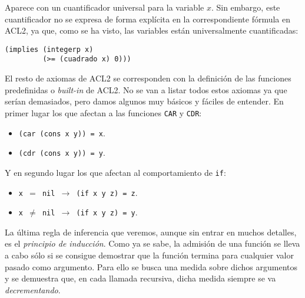 \documentclass[a4paper,10pt]{article}
\begin{document}
\par\vspace{10pt}

Aparece con un cuantificador universal para la variable $x$. Sin embargo, este cuantificador no se expresa de forma explícita en la correspondiente fórmula en ACL2, ya que, como se ha visto, las variables están universalmente cuantificadas:

\par\vspace{10pt}

\begin{lstlisting}[language=clips]
(implies (integerp x)
         (>= (cuadrado x) 0)))
\end{lstlisting}
	
\par\vspace{10pt}

El resto de axiomas de ACL2 se corresponden con la definición de las funciones predefinidas o \emph{built-in} de ACL2. No se van a listar todos estos axiomas ya que serían demasiados, pero damos algunos muy básicos y fáciles de entender. En primer lugar los que afectan a las funciones \texttt{CAR} y \texttt{CDR}:

\par\vspace{10pt}

\begin{itemize}
	\item \texttt{(car (cons x y)) = x}.
	\item \texttt{(cdr (cons x y)) = y}.
\end{itemize}

\par\vspace{10pt}

Y en segundo lugar los que afectan al comportamiento de \texttt{if}:

\par\vspace{10pt}

\begin{itemize}
	\item \texttt{x $=$ nil $\to$ (if x y z) = z}.
	\item \texttt{x $\neq$ nil $\to$ (if x y z) = y}.
\end{itemize}

\par\vspace{10pt}

La última regla de inferencia que veremos, aunque sin entrar en muchos detalles, es el \emph{principio de inducción}. Como ya se sabe, la admisión de una función se lleva a cabo sólo si se consigue demostrar que la función termina para cualquier valor pasado como argumento. Para ello se busca una medida sobre dichos argumentos y se demuestra que, en cada llamada recursiva, dicha medida siempre se va \emph{decrementando}.
\end{document}
